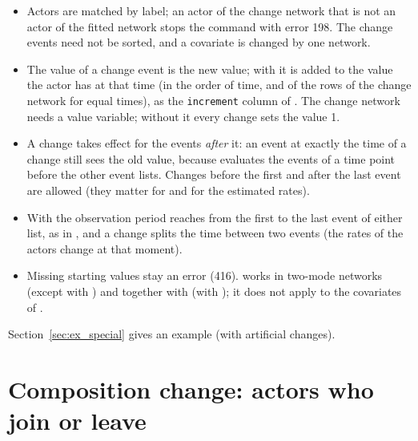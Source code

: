 \begin{itemize}[nosep]
  \item Actors are matched by label; an actor of the change network that is not an actor of the fitted network stops the command with error 198. The change events need not be sorted, and a covariate is changed by one network.
  \item The value of a change event is the new value; with  it is added to the value the actor has at that time (in the order of time, and of the rows of the change network for equal times), as the \texttt{increment} column of \goldfish{}. The change network needs a value variable; without it every change sets the value 1.
  \item A change takes effect for the events \emph{after} it: an event at exactly the time of a change still sees the old value, because \goldfish{} evaluates the events of a time point before the other event lists. Changes before the first and after the last event are allowed (they matter for  and for the estimated rates).
  \item With  the observation period reaches from the first to the last event of either list, as in \goldfish{}, and a change splits the time between two events (the rates of the actors change at that moment).
  \item Missing starting values stay an error (416).  works in two-mode networks (except with ) and together with  (with ); it does not apply to the covariates of .
\end{itemize}
Section~\ref{sec:ex_special} gives an example (with artificial changes).

\section{Composition change: actors who join or leave}\label{sec:composition}

